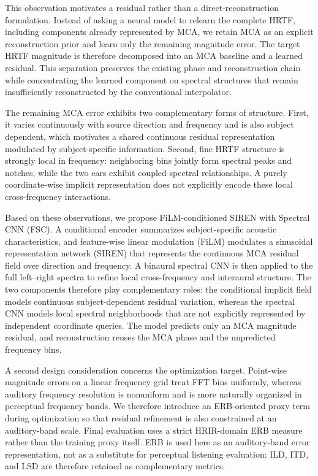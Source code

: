 \documentclass[UTF8,a4paper]{article}
\begin{document}
This observation motivates a residual rather than a direct-reconstruction formulation. Instead of asking a neural model to relearn the complete HRTF, including components already represented by MCA, we retain MCA as an explicit reconstruction prior and learn only the remaining magnitude error. The target HRTF magnitude is therefore decomposed into an MCA baseline and a learned residual. This separation preserves the existing phase and reconstruction chain while concentrating the learned component on spectral structures that remain insufficiently reconstructed by the conventional interpolator.

The remaining MCA error exhibits two complementary forms of structure. First, it varies continuously with source direction and frequency and is also subject dependent, which motivates a shared continuous residual representation modulated by subject-specific information. Second, fine HRTF structure is strongly local in frequency: neighboring bins jointly form spectral peaks and notches, while the two ears exhibit coupled spectral relationships. A purely coordinate-wise implicit representation does not explicitly encode these local cross-frequency interactions.

Based on these observations, we propose FiLM-conditioned SIREN with Spectral CNN (FSC). A conditional encoder summarizes subject-specific acoustic characteristics, and feature-wise linear modulation (FiLM)\cite{R7} modulates a sinusoidal representation network (SIREN)\cite{R11} that represents the continuous MCA residual field over direction and frequency. A binaural spectral CNN is then applied to the full left--right spectra to refine local cross-frequency and interaural structure. The two components therefore play complementary roles: the conditional implicit field models continuous subject-dependent residual variation, whereas the spectral CNN models local spectral neighborhoods that are not explicitly represented by independent coordinate queries. The model predicts only an MCA magnitude residual, and reconstruction reuses the MCA phase and the unpredicted frequency bins.

A second design consideration concerns the optimization target. Point-wise magnitude errors on a linear frequency grid treat FFT bins uniformly, whereas auditory frequency resolution is nonuniform and is more naturally organized in perceptual frequency bands. We therefore introduce an ERB-oriented proxy term during optimization so that residual refinement is also constrained at an auditory-band scale. Final evaluation uses a strict HRIR-domain ERB measure rather than the training proxy itself. ERB is used here as an auditory-band error representation, not as a substitute for perceptual listening evaluation; ILD, ITD, and LSD are therefore retained as complementary metrics.
\end{document}
